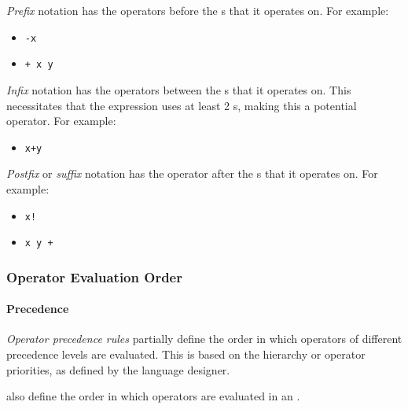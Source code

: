 \begin{definition}[Prefix]\label{def:Fixity-Prefix}
  \emph{Prefix} notation has the operators before the s that it operates on.
  For example:
  \begin{itemize}[noitemsep]
  \item \texttt{-x}
  \item \texttt{+ x y}
  \end{itemize}
\end{definition}

\begin{definition}[Infix]\label{def:Fixity-Infix}
  \emph{Infix} notation has the operators between the s that it operates on.
  This necessitates that the expression uses at least 2 s, making this a potential  operator.
  For example:
  \begin{itemize}[noitemsep]
  \item \texttt{x+y}
  \end{itemize}
\end{definition}

\begin{definition}[Suffix]\label{def:Fixity-Suffix}
  \emph{Postfix} or \emph{suffix} notation has the operator after the s that it operates on.
  For example:
  \begin{itemize}[noitemsep]
  \item \texttt{x!}
  \item \texttt{x y +}
  \end{itemize}
\end{definition}

\subsubsection{Operator Evaluation Order}\label{subsubsec:Operator_Evaluation_Order}
\paragraph{Precedence}\label{par:Operator_Evaluation_Order-Precedence}
\begin{definition}\label{def:Operator_Precedence_Rules}
  \emph{Operator precedence rules} partially define the order in which operators of different precedence levels are evaluated.
  This is based on the hierarchy or operator priorities, as defined by the language designer.

  \begin{remark}
     also define the order in which operators are evaluated in an .
  \end{remark}
\end{definition}

